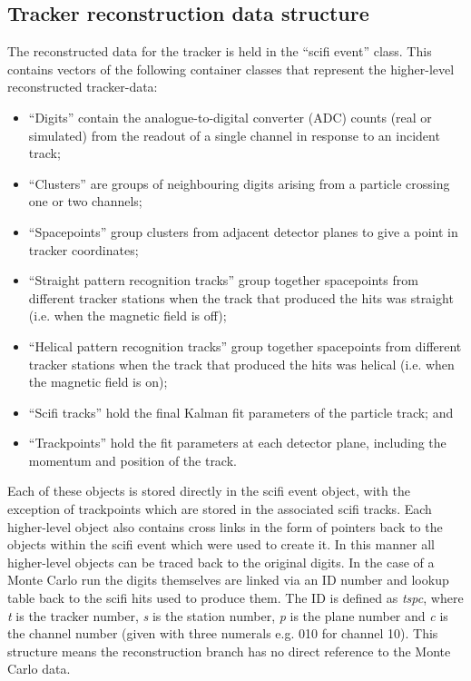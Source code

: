\subsection{Tracker reconstruction data structure}
\label{subsec:TrackerReconDataStructure}
The reconstructed data for the tracker is held in the ``scifi event'' class.  This contains vectors of the following container classes that represent the higher-level reconstructed tracker-data:

\begin{itemize}
  \item ``Digits'' contain the analogue-to-digital converter (ADC) counts (real or simulated) from the readout of a single channel in response to an incident track;
  \item ``Clusters'' are groups of neighbouring digits arising from a particle crossing one or two channels;
  \item ``Spacepoints'' group clusters from adjacent detector planes to give a point in tracker coordinates;
  \item ``Straight pattern recognition tracks'' group together spacepoints from different tracker stations when the track that produced the hits was straight (i.e. when the magnetic field is off); %
  \item ``Helical pattern recognition tracks'' group together spacepoints from different tracker stations when the track that produced the hits was helical (i.e. when the magnetic field is on); %
  \item ``Scifi tracks'' hold the final Kalman fit parameters of the particle track; and
  \item ``Trackpoints'' hold the fit parameters at each detector plane, including the momentum and position of the track.
\end{itemize}

Each of these objects is stored directly in the scifi event object, with the exception of trackpoints which are stored in the associated scifi tracks.  Each higher-level object also contains cross links in the form of pointers back to the objects within the scifi event which were used to create it. In this manner all higher-level objects can be traced back to the original digits.  In the case of a Monte Carlo run the digits themselves are linked via an ID number and lookup table back to the scifi hits used to produce them. The ID is defined as \textit{tspc}, where \textit{t} is the tracker number, \textit{s} is the station number, \textit{p} is the plane number and \textit{c} is the channel number (given with three numerals e.g. 010 for channel 10).  This structure means the reconstruction branch has no direct reference to the Monte Carlo data.
